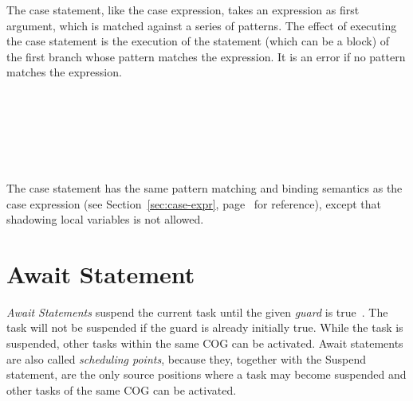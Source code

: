 The case statement, like the case expression, takes an expression as
first argument, which is matched against a series of patterns.  The
effect of executing the case statement is the execution of the statement
(which can be a block) of the first branch whose pattern matches the
expression.  It is an error if no pattern matches the expression.


\begin{abssyntax}
        {}\ \ \TRS{\{} \ \TRS{\}}\\
     {}\ \TRS{=>}\ \ \TRS{;}\\
        {}
                  {}
                  {}
                  \TRS{\_}\\
  {}\ \\
    {}\ 
\end{abssyntax}

The case statement has the same pattern matching and binding semantics
as the case expression (see Section~\ref{sec:case-expr},
page~\pageref{sec:case-expr} for reference), except that shadowing local
variables is not allowed.


\section{Await Statement}
\emph{Await Statements} suspend the current task until the given
\emph{guard} is true~\cite{johnsen10fmco}. The task will not be
suspended if the guard is already initially true.  While the task is
suspended, other tasks within the same COG can be activated.  Await
statements are also called \emph{scheduling points}, because they, together with the Suspend statement, are
the only source positions where a task may become suspended and other
tasks of the same COG can be activated.


\begin{abssyntax}
   {}\ \ \TRS{;}\\
       {}
               {}
               {}\ \TRS{\&}\ \\
  {}\ 
               {}\ 
\end{abssyntax}

